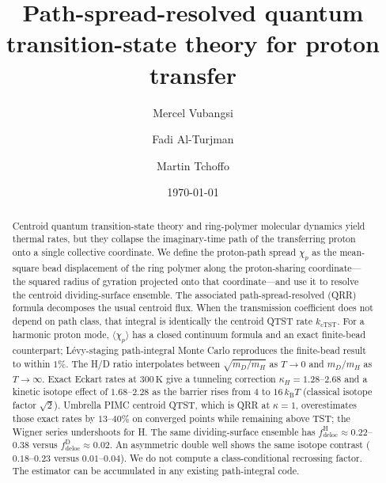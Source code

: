 \documentclass[%
 aip,
 jcp,
 amsmath,amssymb,
 reprint,
 floatfix,
]{revtex4-2}
\newcommand{\avg}[1]{\langle #1 \rangle}
\newcommand{\chip}{\chi_p}
\newcommand{\kB}{k_{\mathrm{B}}}
\newcommand{\kcTST}{k_{\mathrm{cTST}}}
\begin{document}

\title[Path-spread-resolved QTST]{Path-spread-resolved quantum transition-state theory for proton transfer}

\author{Mercel Vubangsi}

\author{Fadi Al-Turjman}

\author{Martin Tchoffo}

\date{\today}

\begin{abstract}
Centroid quantum transition-state theory and ring-polymer molecular dynamics yield thermal rates, but they collapse the imaginary-time path of the transferring proton onto a single collective coordinate. We define the proton-path spread $\chip$ as the mean-square bead displacement of the ring polymer along the proton-sharing coordinate---the squared radius of gyration projected onto that coordinate---and use it to resolve the centroid dividing-surface ensemble. The associated path-spread-resolved (QRR) formula decomposes the usual centroid flux. When the transmission coefficient does not depend on path class, that integral is identically the centroid QTST rate $\kcTST$. For a harmonic proton mode, $\avg{\chip}$ has a closed continuum formula and an exact finite-bead counterpart; L\'evy-staging path-integral Monte Carlo reproduces the finite-bead result to within $1\%$. The H/D ratio interpolates between $\sqrt{m_D/m_H}$ as $T\to 0$ and $m_D/m_H$ as $T\to\infty$. Exact Eckart rates at $300\,\mathrm{K}$ give a tunneling correction $\kappa_H=1.28$--$2.68$ and a kinetic isotope effect of $1.68$--$2.28$ as the barrier rises from $4$ to $16\,\kB T$ (classical isotope factor $\sqrt{2}$). Umbrella PIMC centroid QTST, which is QRR at $\kappa=1$, overestimates those exact rates by $13$--$40\%$ on converged points while remaining above TST; the Wigner series undershoots for H. The same dividing-surface ensemble has $f_{\mathrm{deloc}}^{\mathrm{H}}\approx 0.22$--$0.38$ versus $f_{\mathrm{deloc}}^{\mathrm{D}}\approx 0.02$. An asymmetric double well shows the same isotope contrast ($0.18$--$0.23$ versus $0.01$--$0.04$). We do not compute a class-conditional recrossing factor. The estimator can be accumulated in any existing path-integral code.
\end{abstract}
\end{document}
